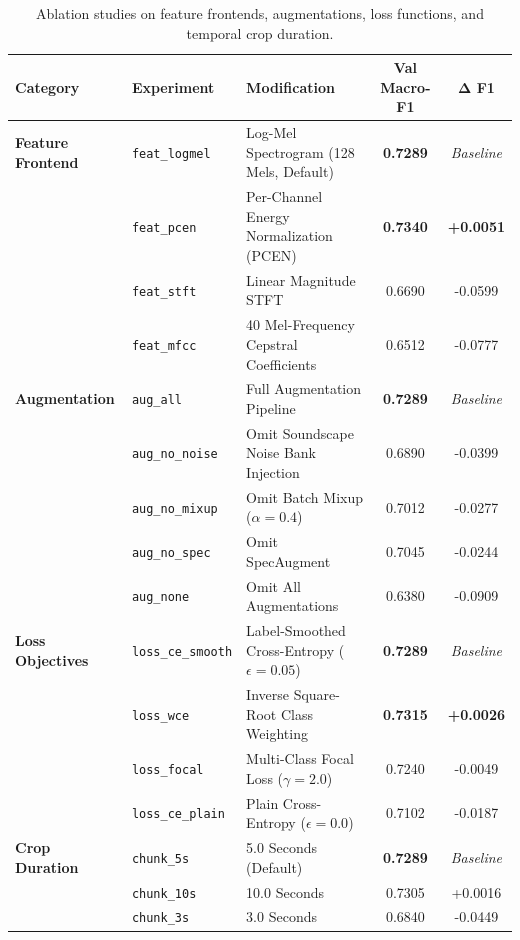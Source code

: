\documentclass[11pt,a4paper]{article}
\begin{document}
\begin{table}[H]
\centering
\small
\setlength{\tabcolsep}{5pt}
\caption{Ablation studies on feature frontends, augmentations, loss functions, and temporal crop duration.}
\label{tab:ablations}
\begin{tabularx}{\textwidth}{lllcc}
\toprule
\textbf{Category} & \textbf{Experiment} & \textbf{Modification} & \textbf{Val Macro-F1} & $\mathbf{\Delta}$ \textbf{F1} \\
\midrule
\textbf{Feature Frontend} & \texttt{feat\_logmel} & Log-Mel Spectrogram (128 Mels, Default) & \textbf{0.7289} & \textit{Baseline} \\
& \texttt{feat\_pcen} & Per-Channel Energy Normalization (PCEN) & \textbf{0.7340} & \textbf{+0.0051} \\
& \texttt{feat\_stft} & Linear Magnitude STFT & 0.6690 & -0.0599 \\
& \texttt{feat\_mfcc} & 40 Mel-Frequency Cepstral Coefficients & 0.6512 & -0.0777 \\
\midrule
\textbf{Augmentation} & \texttt{aug\_all} & Full Augmentation Pipeline & \textbf{0.7289} & \textit{Baseline} \\
& \texttt{aug\_no\_noise} & Omit Soundscape Noise Bank Injection & 0.6890 & -0.0399 \\
& \texttt{aug\_no\_mixup} & Omit Batch Mixup ($\alpha = 0.4$) & 0.7012 & -0.0277 \\
& \texttt{aug\_no\_spec} & Omit SpecAugment & 0.7045 & -0.0244 \\
& \texttt{aug\_none} & Omit All Augmentations & 0.6380 & -0.0909 \\
\midrule
\textbf{Loss Objectives} & \texttt{loss\_ce\_smooth} & Label-Smoothed Cross-Entropy ($\epsilon=0.05$) & \textbf{0.7289} & \textit{Baseline} \\
& \texttt{loss\_wce} & Inverse Square-Root Class Weighting & \textbf{0.7315} & \textbf{+0.0026} \\
& \texttt{loss\_focal} & Multi-Class Focal Loss ($\gamma = 2.0$) & 0.7240 & -0.0049 \\
& \texttt{loss\_ce\_plain} & Plain Cross-Entropy ($\epsilon = 0.0$) & 0.7102 & -0.0187 \\
\midrule
\textbf{Crop Duration} & \texttt{chunk\_5s} & 5.0 Seconds (Default) & \textbf{0.7289} & \textit{Baseline} \\
& \texttt{chunk\_10s} & 10.0 Seconds & 0.7305 & +0.0016 \\
& \texttt{chunk\_3s} & 3.0 Seconds & 0.6840 & -0.0449 \\
\bottomrule
\end{tabularx}
\end{table}
\end{document}
